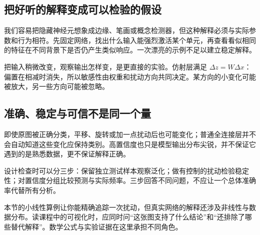 \subsection*{把好听的解释变成可以检验的假设}
我们容易把隐藏神经元想象成边缘、笔画或概念检测器，但这种解释必须与实际参数和行为相符。先固定网络，找出什么输入能强烈激活某个单元，再查看看似相同的特征在不同背景下是否仍产生类似响应。一次漂亮的示例不足以建立稳定解释。

把输入稍微改变，观察输出怎样变，是更直接的实验。仿射层满足 $\Delta z=W\Delta x$：偏置在相减时消失，所以敏感性由权重和扰动方向共同决定。某方向的小变化可能被放大，另一些方向可能被忽略。

\subsection*{准确、稳定与可信不是同一个量}
即使原图被正确分类，平移、旋转或加一点扰动后也可能变化；普通全连接层并不会自动知道这些变化应保持类别。高置信度也只是模型输出分布尖锐，并不保证它遇到的是熟悉数据，更不保证解释正确。

设计检查时可以分三步：保留独立测试样本观察泛化；做有控制的扰动检验稳定性；对置信度分组比较预测与实际频率。三步回答不同问题，不应让一个总体准确率代替所有分析。

本节的小线性算例让你能精确追踪一次扰动，但真实网络的解释还涉及非线性与数据分布。读课程中的可视化时，应同时问“这张图支持了什么结论”和“还排除了哪些替代解释”。数学公式与实验证据在这里承担不同角色。
